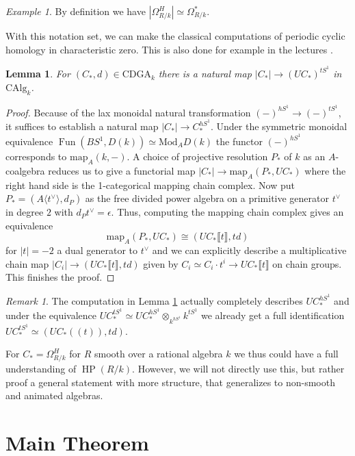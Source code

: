 \documentclass[10pt, reqno]{amsart}
\newtheorem{lemma}[theorem]{Lemma}
\theoremstyle{definition}
\theoremstyle{remark}
\newtheorem{remark}[theorem]{Remark}
\newtheorem{example}[theorem]{Example}
\newcommand{\CAlg}{\mathrm{CAlg}}
\newcommand{\dr}[3]{\Omega^{#3}_{#1/#2}}
\newcommand{\map}{\mathrm{map}}
\newcommand{\llrrbra}[1]{\llbracket #1\rrbracket}
\newcommand{\Mod}{\mathrm{Mod}}
\newcommand{\CDGA}{\mathrm{CDGA}}
\DeclareMathOperator{\HP}{\mathrm{HP}}
\DeclareMathOperator{\Fun}{\mathrm{Fun}}
\begin{document}
\begin{example}
	By definition we have $|\dr RkH|\simeq\dr Rk*$.
\end{example}

With this notation set, we can make the classical computations of periodic cyclic homology in characteristic zero. This is also done for example in the lectures \cite{KN18}.

\begin{lemma}\label{computation}
	For $(C_*,d)\in\CDGA_k$ there is a natural map $|C_*|\to (UC_*)^{tS^1}$ in $\CAlg_k$.
\end{lemma}
\begin{proof}
	Because of the lax monoidal natural transformation $(-)^{hS^1}\to (-)^{tS^1}$, it suffices to establish a natural map $|C_*|\to C_*^{hS^1}$. Under the symmetric monoidal equivalence $\Fun(BS^1,D(k))\simeq\Mod_{A} D(k)$ the functor $(-)^{hS^1}$ corresponds to $\map_{A}(k,-)$. A choice of projective resolution $P_*$ of $k$ as an $A$-coalgebra reduces us to give a functorial map $|C_*|\to\map_{A}(P_*,UC_*)$ where the right hand side is the 1-categorical mapping chain complex. Now put $P_*=(A\langle t^\vee\rangle, d_P)$ as the free divided power algebra on a primitive generator $t^\vee$ in degree $2$ with $d_Pt^\vee=\epsilon$. Thus, computing the mapping chain complex gives an equivalence
	\[\map_A(P_*,UC_*)\cong (UC_*\llrrbra{t},t d)\] 
	for $|t|=-2$ a dual generator to $t^\vee$ and we can explicitly describe a multiplicative chain map $|C_i|\to (UC_*\llrrbra t,td)$ given by $C_i\simeq C_i\cdot t^i\to UC_*\llrrbra t$ on chain groups. This finishes the proof.
\end{proof}
\begin{remark}
	The computation in Lemma \ref{computation} actually completely describes $UC_*^{hS^1}$ and under the equivalence $UC_*^{tS^1}\simeq UC_*^{hS^1}\otimes_{k^{hS^1}}k^{tS^1}$ we already get a full identification $UC_*^{tS^1}\simeq (UC_*(\!(t)\!),td)$.
	
	For $C_*=\dr RkH$ for $R$ smooth over a rational algebra $k$ we thus could have a full understanding of $\HP(R/k)$. However, we will not directly use this, but rather proof a general statement with more structure, that generalizes to non-smooth and animated algebras.
\end{remark}

\section{Main Theorem}\label{main section}
\end{document}
